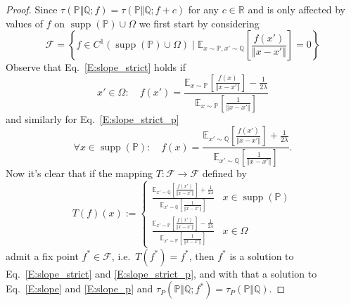 \documentclass{article}
\DeclareMathOperator{\supp}{supp}
\begin{document}
 \begin{proof}
  Since $\tau(\mathbb P\Vert\mathbb Q;f)=\tau(\mathbb P\Vert\mathbb Q;f+c)$ for any $c\in\mathbb R$ and is only affected by
  values of $f$ on $\supp(\mathbb P)\cup\Omega$ we first start by considering
  \[\mathcal F=\left\{f\in C^1(\supp(\mathbb P)\cup\Omega)\mid \mathbb E_{x\sim\mathbb P,x'\sim\mathbb Q}\left[\frac{f(x')}{\Vert x-x'\Vert}\right]=0\right\}\]
  Observe that Eq.\ \ref{E:slope_strict} holds if
 \[x'\in\Omega:\quad f(x')=\frac{\mathbb E_{x\sim\mathbb P}[\frac{f(x)}{\Vert x-x'\Vert}]-\frac{1}{2\lambda}}{\mathbb E_{x\sim\mathbb P}[\frac{1}{\Vert x-x'\Vert}]}\]
 and similarly for Eq.\ \ref{E:slope_strict_p}
 \[\forall x\in\supp(\mathbb P):\quad f(x)=\frac{\mathbb E_{x'\sim\mathbb Q}[\frac{f(x')}{\Vert x-x'\Vert}]+\frac{1}{2\lambda}}{\mathbb E_{x'\sim\mathbb Q}[\frac{1}{\Vert x-x'\Vert}]}.\]
 Now it's clear that if the mapping $T:\mathcal F\to\mathcal F$ defined by
 \begin{equation}\label{E:T_def}
   T(f)(x):=\begin{cases}
   \frac{\mathbb E_{x'\sim\mathbb Q}[\frac{f(x')}{\Vert x-x'\Vert}]+\frac{1}{2\lambda}}{\mathbb E_{x'\sim\mathbb Q}[\frac{1}{\Vert x-x'\Vert}]} & x\in\supp(\mathbb P) \\
   \frac{\mathbb E_{x'\sim\mathbb P}[\frac{f(x')}{\Vert x-x'\Vert}]-\frac{1}{2\lambda}}{\mathbb E_{x'\sim\mathbb P}[\frac{1}{\Vert x-x'\Vert}]} & x\in\Omega
  \end{cases}
 \end{equation}
  admit a fix point $f^*\in\mathcal F$, i.e.\ $T(f^*)=f^*$, then $f^*$ is a solution to Eq.\ \ref{E:slope_strict} and \ref{E:slope_strict_p},
  and with that a solution to Eq.\ \ref{E:slope} and \ref{E:slope_p} and $\tau_P(\mathbb P\Vert\mathbb Q;f^*)=\tau_P(\mathbb P\Vert\mathbb Q)$.


\end{proof}
\end{document}

